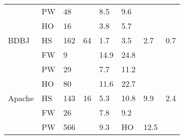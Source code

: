 \begin{figure*}[!t]
\begin{tabular}{|l|l||l|l|ll|l|l|}
                           &PW        & 48                                           &                                            & \multicolumn{1}{l|}{\cellcolor[HTML]{C0C0C0}8.5}  & \cellcolor[HTML]{C0C0C0}9.6  &                       &                       \\ \cline{2-2} \cline{4-5}
                                 &HO  & 16                                          &                                            & \multicolumn{1}{l|}{\cellcolor[HTML]{C0C0C0}3.8}  & \cellcolor[HTML]{C0C0C0}5.7  &                       &                       \\ \cline{2-2} \cline{4-5}
\multirow{-4}{*}{BDBJ}          &HS   & 162                                          & \multirow{-4}{*}{64}                       & \multicolumn{1}{l|}{1.7}                          & 3.5                          & \multirow{-4}{*}{2.7} & \multirow{-4}{*}{0.7} \\ \hline
                            &FW       & 9                                            &                                            & \multicolumn{1}{l|}{\cellcolor[HTML]{C0C0C0}14.9} & \cellcolor[HTML]{C0C0C0}24.8 &                       &                       \\ \cline{2-2} \cline{4-5}
                               &PW    & 29                                           &                                            & \multicolumn{1}{l|}{\cellcolor[HTML]{C0C0C0}7.7}  & \cellcolor[HTML]{C0C0C0}11.2 &                       &                       \\ \cline{2-2} \cline{4-5}
                            &HO       & 80                                           &                                            & \multicolumn{1}{l|}{\cellcolor[HTML]{C0C0C0}11.6} & \cellcolor[HTML]{C0C0C0}22.7 &                       &                       \\ \cline{2-2} \cline{4-5}
\multirow{-4}{*}{Apache}       &HS    & 143                                          & \multirow{-4}{*}{16}                       & \multicolumn{1}{l|}{5.3}                          & 10.8                         & \multirow{-4}{*}{9.9} & \multirow{-4}{*}{2.4} \\ \hline
                              &FW     & 26                                           &                                            & \multicolumn{1}{l|}{\cellcolor[HTML]{C0C0C0}7.8}  & \cellcolor[HTML]{C0C0C0}9.2  &                       &                       \\ \cline{2-2} \cline{4-5}
                     &PW               & 566                                          &                                            & \multicolumn{1}{l|}{\cellcolor[HTML]{C0C0C0}9.3} &HO & \cellcolor[HTML]{C0C0C0}12.5 &                       &                       \\ \cline{2-2} \cline{4-5}

\end{tabular}
\end{figure*}
